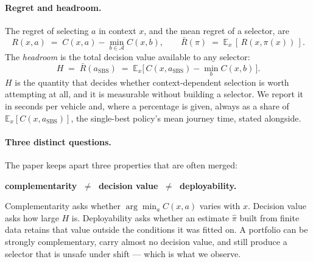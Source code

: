 \paragraph{Regret and headroom.}
The regret of selecting $a$ in context $x$, and the mean regret of a selector,
are
\begin{equation}
R(x,a) \;=\; C(x,a) - \min_{b \in \mathcal{A}} C(x,b),
\qquad
\bar{R}(\pi) \;=\; \mathbb{E}_x\,[\,R(x,\pi(x))\,].
\end{equation}
The \emph{headroom} is the total decision value available to any selector:
\begin{equation}
H \;=\; \bar{R}(a_{\mathrm{SBS}})
   \;=\; \mathbb{E}_x\big[\,C(x,a_{\mathrm{SBS}}) - \min_b C(x,b)\,\big].
\label{eq:headroom}
\end{equation}
$H$ is the quantity that decides whether context-dependent selection is worth
attempting at all, and it is measurable without building a selector. We report
it in seconds per vehicle and, where a percentage is given, always as a share of
$\mathbb{E}_x[C(x,a_{\mathrm{SBS}})]$, the single-best policy's mean journey
time, stated alongside.

\paragraph{Three distinct questions.}
The paper keeps apart three properties that are often merged:
\begin{center}
\textbf{complementarity} $\;\neq\;$ \textbf{decision value} $\;\neq\;$
\textbf{deployability.}
\end{center}
Complementarity asks whether $\arg\min_a C(x,a)$ varies with $x$. Decision value
asks how large $H$ is. Deployability asks whether an estimate $\hat{\pi}$ built
from finite data retains that value outside the conditions it was fitted on. A
portfolio can be strongly complementary, carry almost no decision value, and
still produce a selector that is unsafe under shift --- which is what we
observe.
